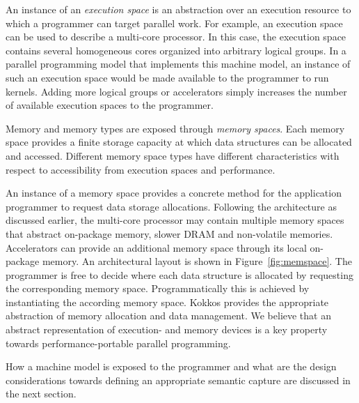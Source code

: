 An instance of an \emph{execution space} is an abstraction over an execution resource to which a programmer can target parallel work. For example, an execution space can be used to describe a multi-core processor. In this case, the execution space contains several homogeneous cores organized into arbitrary logical groups. In a parallel programming model that implements this machine model, an instance of such an execution space would be made available to the programmer to run kernels. Adding more logical groups or accelerators simply increases the number of available execution spaces to the programmer.

Memory and memory types are exposed through \emph{memory spaces}. Each memory space provides a finite storage capacity at which data structures can be allocated and accessed. Different memory space types have different characteristics with respect to accessibility from execution spaces and performance. 

An instance of a memory space provides a concrete method for the application programmer to request data storage allocations. Following the architecture as discussed earlier, the multi-core processor may contain multiple memory spaces that abstract on-package memory, slower DRAM and non-volatile memories. Accelerators can provide an additional memory space through its local on-package memory. An architectural layout is shown in Figure~\ref{fig:memspace}. The programmer is free to decide where each data structure is allocated by requesting the corresponding memory space. Programmatically this is achieved by instantiating the according memory space. Kokkos provides the appropriate abstraction of memory allocation and data management. We believe that an abstract representation of execution- and memory devices is a key property towards performance-portable parallel programming.

How a machine model is exposed to the programmer and what are the design considerations towards defining an appropriate semantic capture are discussed in the next section.


